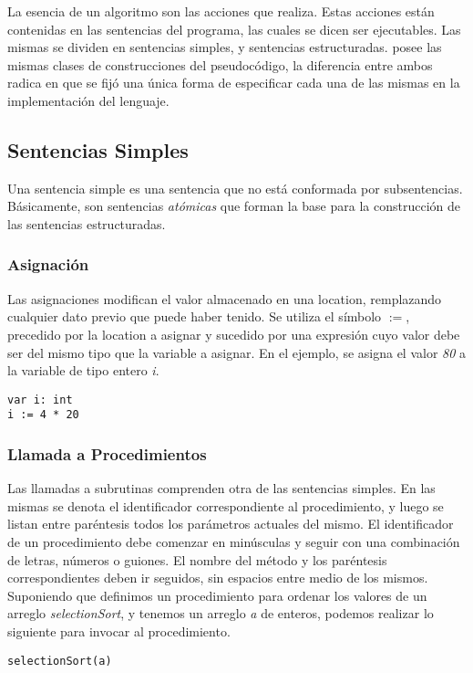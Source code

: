 \documentclass{article}
\begin{document}
La esencia de un algoritmo son las acciones que realiza.
Estas acciones están contenidas en las sentencias del programa, las cuales se dicen ser ejecutables.
Las mismas se dividen en sentencias simples, y sentencias estructuradas.
\Lang\space posee las mismas clases de construcciones del pseudocódigo, la diferencia entre ambos radica en que se fijó una única forma de especificar cada una de las mismas en la implementación del lenguaje.

\subsection{Sentencias Simples}

Una sentencia simple es una sentencia que no está conformada por subsentencias.
Básicamente, son sentencias \textit{atómicas} que forman la base para la construcción de las sentencias estructuradas.

\subsubsection{Asignación}

Las asignaciones modifican el valor almacenado en una location, remplazando cualquier dato previo que puede haber tenido.
Se utiliza el símbolo $:=$, precedido por la location a asignar y sucedido por una expresión cuyo valor debe ser del mismo tipo que la variable a asignar.
En el ejemplo, se asigna el valor \textit{80} a la variable de tipo entero \textit{i}.
\begin{lstlisting}
var i: int
i := 4 * 20
\end{lstlisting}

\subsubsection{Llamada a Procedimientos}

Las llamadas a subrutinas comprenden otra de las sentencias simples.
En las mismas se denota el identificador correspondiente al procedimiento, y luego se listan entre paréntesis todos los parámetros actuales del mismo.
El identificador de un procedimiento debe comenzar en minúsculas y seguir con una combinación de letras, números o guiones.
El nombre del método y los paréntesis correspondientes deben ir seguidos, sin espacios entre medio de los mismos.
Suponiendo que definimos un procedimiento para ordenar los valores de un arreglo \textit{selectionSort}, y tenemos un arreglo \textit{a} de enteros, podemos realizar lo siguiente para invocar al procedimiento.
\begin{lstlisting}
selectionSort(a)
\end{lstlisting}
\end{document}
